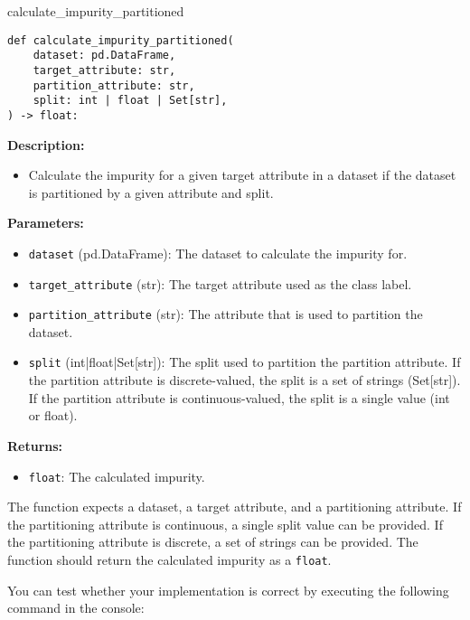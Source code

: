 \documentclass[
english,
smallborders
]{i6prcsht}
\begin{document}
\begin{functionbox}{calculate\_impurity\_partitioned}
	\begin{lstlisting}[numbers=none]
def calculate_impurity_partitioned(
    dataset: pd.DataFrame, 
    target_attribute: str,
    partition_attribute: str, 
    split: int | float | Set[str],
) -> float:
\end{lstlisting}
	
	\textbf{Description:}
	\begin{itemize}[leftmargin=*,topsep=0pt]
		\item Calculate the impurity for a given target attribute in a dataset if the dataset is partitioned by a given attribute and split.
	\end{itemize}
	
	\textbf{Parameters:}
	\begin{itemize}[leftmargin=*,topsep=0pt]
		\item \texttt{dataset} (pd.DataFrame): The dataset to calculate the impurity for.
		\item \texttt{target\_attribute} (str): The target attribute used as the class label.
		\item \texttt{partition\_attribute} (str): The attribute that is used to partition the dataset.
		\item \texttt{split} (int|float|Set[str]): The split used to partition the partition attribute. If the partition attribute is discrete-valued, the split is a set of strings (Set[str]). If the partition attribute is continuous-valued, the split is a single value (int or float).
	\end{itemize}
	
	\textbf{Returns:}
	\begin{itemize}[leftmargin=*,topsep=0pt]
		\item \texttt{float}: The calculated impurity.
	\end{itemize}
\end{functionbox}

\vspace*{0.5cm}

The function expects a dataset, a target attribute, and a partitioning attribute. If the partitioning attribute is continuous, a single split value can be provided. If the partitioning attribute is discrete, a set of strings can be provided. The function should return the calculated impurity as a \texttt{float}.

You can test whether your implementation is correct by executing the following command in the console:
\end{document}
